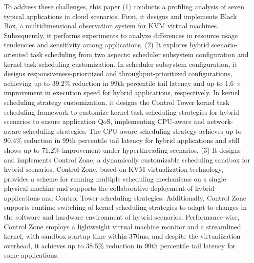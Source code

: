 To address these challenges, this paper (1) conducts a profiling analysis of seven typical applications in cloud scenarios. First, it designs and implements Black Box, a multidimensional observation system for KVM virtual machines. Subsequently, it performs experiments to analyze differences in resource usage tendencies and sensitivity among applications. (2) It explores hybrid scenario-oriented task scheduling from two aspects: scheduler subsystem configuration and kernel task scheduling customization. In scheduler subsystem configuration, it designs responsiveness-prioritized and throughput-prioritized configurations, achieving up to 39.2\% reduction in 99th percentile tail latency and up to 1.6 $\times$ improvement in execution speed for hybrid applications, respectively. In kernel scheduling strategy customization, it designs the Control Tower kernel task scheduling framework to customize kernel task scheduling strategies for hybrid scenarios to ensure application QoS, implementing CPU-aware and network-aware scheduling strategies. The CPU-aware scheduling strategy achieves up to 90.4\% reduction in 99th percentile tail latency for hybrid applications and still shows up to 71.2\% improvement under hyperthreading scenarios. (3) It designs and implements Control Zone, a dynamically customizable scheduling sandbox for hybrid scenarios. Control Zone, based on KVM virtualization technology, provides a scheme for running multiple scheduling mechanisms on a single physical machine and supports the collaborative deployment of hybrid applications and Control Tower scheduling strategies. Additionally, Control Zone supports runtime switching of kernel scheduling strategies to adapt to changes in the software and hardware environment of hybrid scenarios. Performance-wise, Control Zone employs a lightweight virtual machine monitor and a streamlined kernel, with sandbox startup time within 370ms, and despite the virtualization overhead, it achieves up to 38.5\% reduction in 99th percentile tail latency for some applications.



\pagestyle{enfrontmatterstyle}%
\cleardoublepage\pagestyle{frontmatterstyle}%

